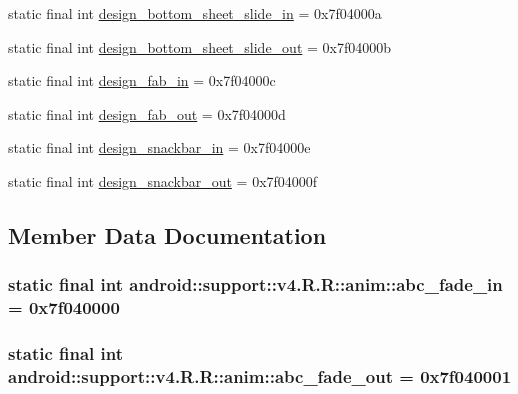 \begin{CompactItemize}
\item 
static final int \hyperlink{classandroid_1_1support_1_1v4_1_1_r_1_1anim_25c6349bc535153c4d6121447b0e15a4}{design\_\-bottom\_\-sheet\_\-slide\_\-in} = 0x7f04000a
\item 
static final int \hyperlink{classandroid_1_1support_1_1v4_1_1_r_1_1anim_cc121a7a543362b5fc483e76cb5c5594}{design\_\-bottom\_\-sheet\_\-slide\_\-out} = 0x7f04000b
\item 
static final int \hyperlink{classandroid_1_1support_1_1v4_1_1_r_1_1anim_562c696c38dea3cf97d66a5ee981fed2}{design\_\-fab\_\-in} = 0x7f04000c
\item 
static final int \hyperlink{classandroid_1_1support_1_1v4_1_1_r_1_1anim_b0031e85ffa2796ba33e641f229c24e7}{design\_\-fab\_\-out} = 0x7f04000d
\item 
static final int \hyperlink{classandroid_1_1support_1_1v4_1_1_r_1_1anim_148a7ebbbe7b6c59c304842b4069a114}{design\_\-snackbar\_\-in} = 0x7f04000e
\item 
static final int \hyperlink{classandroid_1_1support_1_1v4_1_1_r_1_1anim_8e6af702869770630ff0f1c614dc4a98}{design\_\-snackbar\_\-out} = 0x7f04000f
\end{CompactItemize}


\subsection{Member Data Documentation}
\hypertarget{classandroid_1_1support_1_1v4_1_1_r_1_1anim_736d31a586a0a03b16a2f7355debf687}{
\subsubsection[{abc\_\-fade\_\-in}]{\setlength{\rightskip}{0pt plus 5cm}static final int android::support::v4.R.R::anim::abc\_\-fade\_\-in = 0x7f040000}}
\label{classandroid_1_1support_1_1v4_1_1_r_1_1anim_736d31a586a0a03b16a2f7355debf687}


\hypertarget{classandroid_1_1support_1_1v4_1_1_r_1_1anim_b9dab8fbba9150b337132581b1da69ef}{
\subsubsection[{abc\_\-fade\_\-out}]{\setlength{\rightskip}{0pt plus 5cm}static final int android::support::v4.R.R::anim::abc\_\-fade\_\-out = 0x7f040001}}
\label{classandroid_1_1support_1_1v4_1_1_r_1_1anim_b9dab8fbba9150b337132581b1da69ef}


